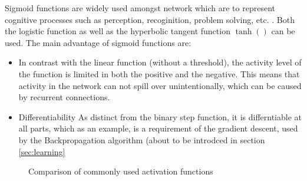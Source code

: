 \documentclass[10pt,a4paper,DIV=11]{scrreprt}
\begin{document}
Sigmoid functions are widely used amongst network which are to represent cognitive processes such as perception, recoginition, problem solving, etc. .
Both the logistic function as well as the hyperbolic tangent function $\tanh()$ can be used. The main advantage of sigmoid functions are:

\begin{itemize}
\item In contrast with the linear function (without a threshold), the activity level of the function is limited in both the positive and the negative. This means that activity in the network can not spill over unintentionally, which can be caused by recurrent connections.
\item Differentiability
As distinct from the binary step function, it is differntiable at all parts, which as an example, is a requirement of the gradient descent, used by the Backpropagation algorithm (about to be introdced in section \ref{sec:learning}
\end{itemize}


\begin{figure}[H]
\centering
{}



	
\caption{Comparison of commonly used activation functions}
\label{fig:plots}
\end{figure}
\end{document}
